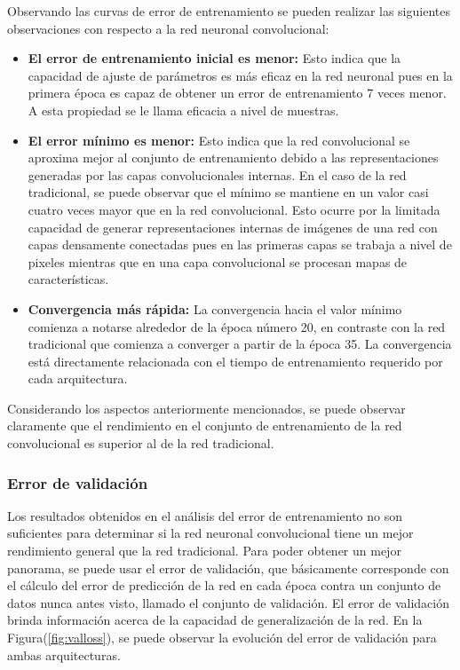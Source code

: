         Observando las curvas de error de entrenamiento se pueden realizar las siguientes observaciones con respecto a la red neuronal convolucional:

        \begin{itemize}
            \item \textbf{El error de entrenamiento inicial es menor:} Esto indica que la capacidad de ajuste de parámetros 
            es más eficaz en la red neuronal pues en la primera época es capaz de obtener un error de entrenamiento 7 veces 
            menor. A esta propiedad se le llama eficacia a nivel de muestras.
            \item \textbf{El error mínimo es menor:} Esto indica que la red convolucional se aproxima mejor al conjunto de 
            entrenamiento debido a las representaciones generadas por las capas convolucionales internas. En el caso de la red 
            tradicional, se puede observar que el mínimo se mantiene en un valor casi cuatro veces mayor que en la red convolucional. 
            Esto ocurre por la limitada capacidad de generar representaciones internas de imágenes de una red con capas densamente conectadas pues 
            en las primeras capas se trabaja a nivel de pixeles mientras que en una capa convolucional se procesan mapas de características.
            \item \textbf{Convergencia más rápida:} La convergencia hacia el valor mínimo comienza a notarse alrededor de la época número 20, 
            en contraste con la red tradicional que comienza a converger a partir de la época 35. La convergencia está directamente 
            relacionada con el tiempo de entrenamiento requerido por cada arquitectura.
        \end{itemize}

        Considerando los aspectos anteriormente mencionados, se puede observar claramente que el rendimiento en el conjunto 
        de entrenamiento de la red convolucional es superior al de la red tradicional.

        \subsubsection{Error de validación}
        Los resultados obtenidos en el análisis del error de entrenamiento no son suficientes para determinar si la red neuronal 
        convolucional tiene un mejor rendimiento general que la red tradicional. Para poder obtener un mejor panorama, se puede 
        usar el error de validación, que básicamente corresponde con el cálculo del error de predicción de la red en cada época 
        contra un conjunto de datos nunca antes visto, llamado el conjunto de validación. El error de validación brinda información 
        acerca de la capacidad de generalización de la red. En la Figura(\ref{fig:valloss}), se puede observar la evolución del error de 
        validación para ambas arquitecturas.

